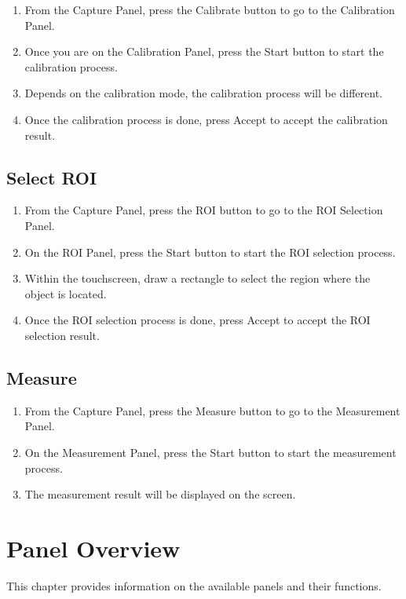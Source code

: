 \begin{enumerate}
    \item From the Capture Panel, press the Calibrate button to go to the Calibration Panel.
    \item Once you are on the Calibration Panel, press the Start button to start the calibration process.
    \item Depends on the calibration mode, the calibration process will be different.
    \item Once the calibration process is done, press Accept to accept the calibration result.
\end{enumerate}

\section{Select ROI}

\begin{enumerate}
    \item From the Capture Panel, press the ROI button to go to the ROI Selection Panel.
    \item On the ROI Panel, press the Start button to start the ROI selection process.
    \item Within the touchscreen, draw a rectangle to select the region where the object is located.
    \item Once the ROI selection process is done, press Accept to accept the ROI selection result.
\end{enumerate}

\section{Measure}

\begin{enumerate}
    \item From the Capture Panel, press the Measure button to go to the Measurement Panel.
    \item On the Measurement Panel, press the Start button to start the measurement process.
    \item The measurement result will be displayed on the screen.
\end{enumerate}


\chapter{Panel Overview}

This chapter provides information on the available panels and their functions.

